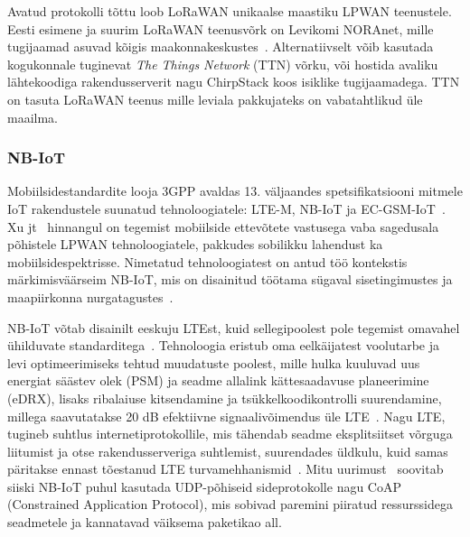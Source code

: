 \documentclass[12pt]{article}
\begin{document}
    Avatud protokolli tõttu loob LoRaWAN unikaalse maastiku LPWAN teenustele.
    Eesti esimene ja suurim LoRaWAN teenusvõrk on Levikomi NORAnet, mille tugijaamad asuvad kõigis maakonnakeskustes~\cite{noranetuudis}.
    Alternatiivselt võib kasutada kogukonnale tuginevat \textit{The Things Network} (TTN) võrku, või hostida avaliku lähtekoodiga rakendusserverit nagu ChirpStack koos isiklike tugijaamadega.
    TTN on tasuta LoRaWAN teenus mille leviala pakkujateks on vabatahtlikud üle maailma.

    \subsubsection{NB-IoT}

    Mobiilsidestandardite looja 3GPP avaldas 13. väljaandes spetsifikatsiooni mitmele IoT rakendustele suunatud tehnoloogiatele: LTE-M, NB-IoT ja EC-GSM-IoT~\cite{3gppiot}.
    Xu jt~\cite{xuyao} hinnangul on tegemist mobiilside ettevõtete vastusega vaba sagedusala põhistele LPWAN tehnoloogiatele, pakkudes sobilikku lahendust ka mobiilsidespektrisse.
    Nimetatud tehnoloogiatest on antud töö kontekstis märkimisväärseim NB-IoT, mis on disainitud töötama sügaval sisetingimustes ja maapiirkonna nurgatagustes~\cite{martinez}.

    NB-IoT võtab disainilt eeskuju LTEst, kuid sellegipoolest pole tegemist omavahel ühilduvate standarditega~\cite{wanglin}.
    Tehnoloogia eristub oma eelkäijatest voolutarbe ja levi optimeerimiseks tehtud muudatuste poolest, mille hulka kuuluvad uus energiat säästev olek (PSM) ja seadme allalink kättesaadavuse planeerimine (eDRX), lisaks ribalaiuse kitsendamine ja tsükkelkoodikontrolli suurendamine, millega saavutatakse 20 dB efektiivne signaalivõimendus üle LTE~\cite{xuyao}.
    Nagu LTE, tugineb suhtlus internetiprotokollile, mis tähendab seadme eksplitsiitset võrguga liitumist ja otse rakendusserveriga suhtlemist, suurendades üldkulu, kuid samas päritakse ennast tõestanud LTE turvamehhanismid~\cite{basu}.
    Mitu uurimust~\cite{wirges, larmo} soovitab siiski NB-IoT puhul kasutada UDP-põhiseid sideprotokolle nagu CoAP (Constrained Application Protocol), mis sobivad paremini piiratud ressurssidega seadmetele ja kannatavad väiksema paketikao all.
\end{document}
